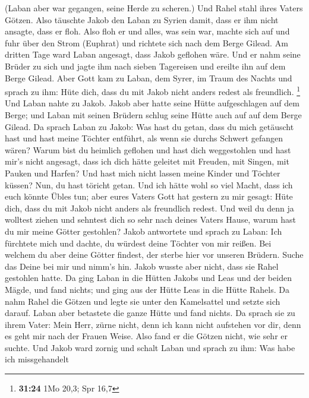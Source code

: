 (Laban aber war gegangen, seine Herde zu scheren.) Und Rahel stahl ihres
Vaters Götzen.  Also täuschte Jakob den Laban zu Syrien
damit, dass er ihm nicht ansagte, dass er floh.  Also floh
er und alles, was sein war, machte sich auf und fuhr über den Strom
(Euphrat) und richtete sich nach dem Berge Gilead.  Am
dritten Tage ward Laban angesagt, dass Jakob geflohen wäre.
 Und er nahm seine Brüder zu sich und jagte ihm nach sieben
Tagereisen und ereilte ihn auf dem Berge Gilead.  Aber Gott
kam zu Laban, dem Syrer, im Traum des Nachts und sprach zu ihm: Hüte
dich, dass du mit Jakob nicht anders redest als freundlich. \footnote{\textbf{31:24}
  1Mo 20,3; Spr 16,7}  Und Laban nahte zu Jakob. Jakob aber
hatte seine Hütte aufgeschlagen auf dem Berge; und Laban mit seinen
Brüdern schlug seine Hütte auch auf auf dem Berge Gilead. 
Da sprach Laban zu Jakob: Was hast du getan, dass du mich getäuscht hast
und hast meine Töchter entführt, als wenn sie durchs Schwert gefangen
wären?  Warum bist du heimlich geflohen und hast dich
weggestohlen und hast mir's nicht angesagt, dass ich dich hätte geleitet
mit Freuden, mit Singen, mit Pauken und Harfen?  Und hast
mich nicht lassen meine Kinder und Töchter küssen? Nun, du hast töricht
getan.  Und ich hätte wohl so viel Macht, dass ich euch
könnte Übles tun; aber eures Vaters Gott hat gestern zu mir gesagt: Hüte
dich, dass du mit Jakob nicht anders als freundlich redest.
 Und weil du denn ja wolltest ziehen und sehntest dich so
sehr nach deines Vaters Hause, warum hast du mir meine Götter gestohlen?
 Jakob antwortete und sprach zu Laban: Ich fürchtete mich
und dachte, du würdest deine Töchter von mir reißen.  Bei
welchem du aber deine Götter findest, der sterbe hier vor unseren
Brüdern. Suche das Deine bei mir und nimm's hin. Jakob wusste aber
nicht, dass sie Rahel gestohlen hatte.  Da ging Laban in
die Hütten Jakobs und Leas und der beiden Mägde, und fand nichts; und
ging aus der Hütte Leas in die Hütte Rahels.  Da nahm Rahel
die Götzen und legte sie unter den Kamelsattel und setzte sich darauf.
Laban aber betastete die ganze Hütte und fand nichts.  Da
sprach sie zu ihrem Vater: Mein Herr, zürne nicht, denn ich kann nicht
aufstehen vor dir, denn es geht mir nach der Frauen Weise. Also fand er
die Götzen nicht, wie sehr er suchte.  Und Jakob ward
zornig und schalt Laban und sprach zu ihm: Was habe ich missgehandelt
